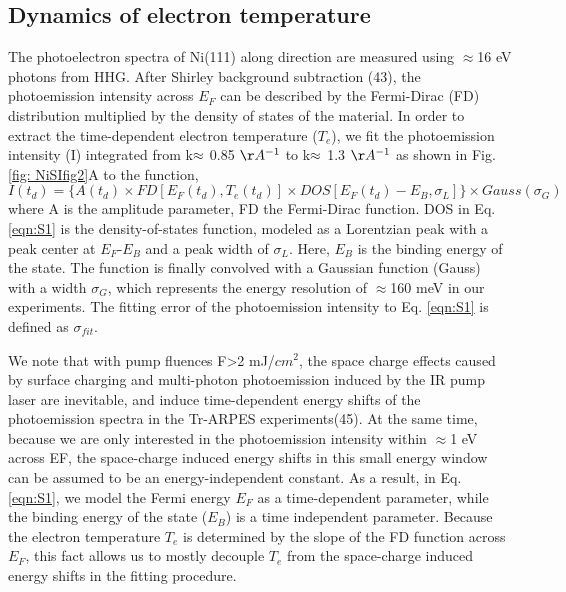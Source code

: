 \subsection{Dynamics of electron temperature}
The photoelectron spectra of Ni(111) along  direction are measured using $\approx$16 eV photons from HHG. After Shirley background subtraction (43), the photoemission intensity across $E_{F}$ can be described by the Fermi-Dirac (FD) distribution multiplied by the density of states of the material. In order to extract the time-dependent electron temperature ($T_e$), we fit the photoemission intensity (I) integrated from k$\/\/ \approx$ 0.85 $\AA^{-1}$  to k$\/\/ \approx$ 1.3 $\AA^{-1}$ as shown in Fig. \ref{fig: NiSIfig2}A to the function,
\begin{equation}
I(t_{d})=\{A(t_d)\times FD[E_F(t_d),T_e(t_d)]\times DOS[E_F(t_d)-E_B,\sigma_L]\}\times\textit{Gauss}(\sigma_G)
\label{eqn:S1}
\end{equation}
where A is the amplitude parameter, FD the Fermi-Dirac function. DOS in Eq. \ref{eqn:S1} is the density-of-states function, modeled as a Lorentzian peak with a peak center at $E_F$-$E_B$ and a peak width of $\sigma_L$. Here, $E_B$ is the binding energy of the state. The function is finally convolved with a Gaussian function (Gauss) with a width $\sigma_G$, which represents the energy resolution of $\approx$160 meV in our experiments. The fitting error of the photoemission intensity to Eq. \ref{eqn:S1} is defined as $\sigma_{fit}$.

We note that with pump fluences F>2 mJ/$cm^2$, the space charge effects caused by surface charging and multi-photon photoemission induced by the IR pump laser are inevitable, and induce time-dependent energy shifts of the photoemission spectra in the Tr-ARPES experiments(45). At the same time, because we are only interested in the photoemission intensity within $\approx$1 eV across EF, the space-charge induced energy shifts in this small energy window can be assumed to be an energy-independent constant. As a result, in Eq. \ref{eqn:S1}, we model the Fermi energy $E_F$ as a time-dependent parameter, while the binding energy of the state ($E_B$) is a time independent parameter. Because the electron temperature $T_e$ is determined by the slope of the FD function across $E_F$, this fact allows us to mostly decouple $T_e$ from the space-charge induced energy shifts in the fitting procedure.

